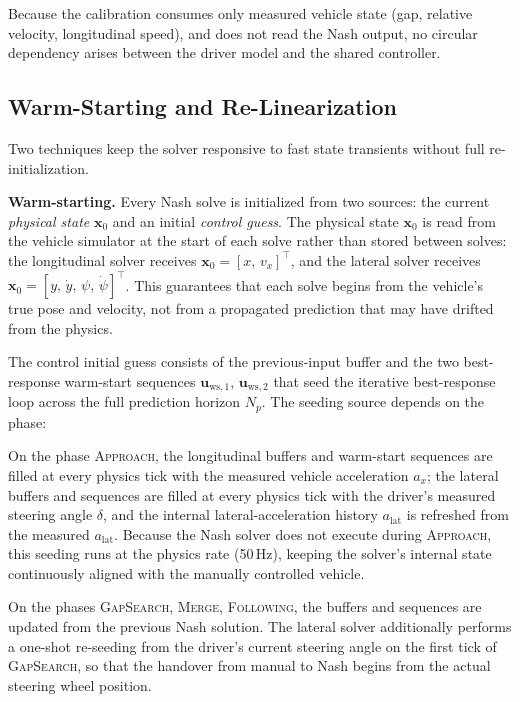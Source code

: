 \documentclass[12pt,a4paper,oneside]{report}
\begin{document}
Because the calibration consumes only measured vehicle state (gap, relative velocity, longitudinal speed), and does not read the Nash output, no circular dependency arises between the driver model and the shared controller.

\subsection{Warm-Starting and Re-Linearization}
\label{sec:nash_warm}

Two techniques keep the solver responsive to fast state transients without full re-initialization.

\textbf{Warm-starting.}  Every Nash solve is initialized from two sources: the current \emph{physical state} $\mathbf{x}_0$ and an initial \emph{control guess}. The physical state $\mathbf{x}_0$ is read from the vehicle simulator at the start of each solve rather than stored between solves: the longitudinal solver receives $\mathbf{x}_0 = [x,\, v_x]^{\top}$, and the lateral solver receives $\mathbf{x}_0 = [y,\, \dot{y},\, \psi,\, \dot{\psi}]^{\top}$. This guarantees that each solve begins from the vehicle's true pose and velocity, not from a propagated prediction that may have drifted from the physics.

The control initial guess consists of the previous-input buffer and the two best-response warm-start sequences $\mathbf{u}_{\mathrm{ws},1}$, $\mathbf{u}_{\mathrm{ws},2}$ that seed the iterative best-response loop across the full prediction horizon $N_p$. The seeding source depends on the phase:
    
    
    On the phase \textsc{Approach}, the longitudinal buffers and warm-start sequences are filled at every physics tick with the measured vehicle acceleration $a_x$; the lateral buffers and sequences are filled at every physics tick with the driver's measured steering angle $\delta$, and the internal lateral-acceleration history $a_{\mathrm{lat}}$ is refreshed from the measured $a_{\mathrm{lat}}$. Because the Nash solver does not execute during \textsc{Approach}, this seeding runs at the physics rate (50\,Hz), keeping the solver's internal state continuously aligned with the manually controlled vehicle.

    On the phases \textsc{GapSearch}, \textsc{Merge}, \textsc{Following}, the buffers and sequences are updated from the previous Nash solution. The lateral solver additionally performs a one-shot re-seeding from the driver's current steering angle on the first tick of \textsc{GapSearch}, so that the handover from manual to Nash begins from the actual steering wheel position.
\end{document}
